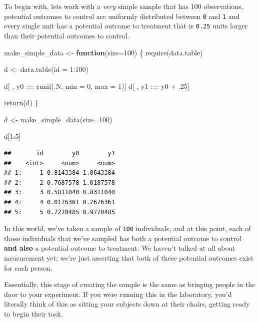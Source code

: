 \documentclass[
]{article}
\newenvironment{Shaded}{\begin{snugshade}}{\end{snugshade}}
\newcommand{\AttributeTok}[1]{\textcolor[rgb]{0.77,0.63,0.00}{#1}}
\newcommand{\ControlFlowTok}[1]{\textcolor[rgb]{0.13,0.29,0.53}{\textbf{#1}}}
\newcommand{\DecValTok}[1]{\textcolor[rgb]{0.00,0.00,0.81}{#1}}
\newcommand{\ErrorTok}[1]{\textcolor[rgb]{0.64,0.00,0.00}{\textbf{#1}}}
\newcommand{\FunctionTok}[1]{\textcolor[rgb]{0.00,0.00,0.00}{#1}}
\newcommand{\NormalTok}[1]{#1}
\newcommand{\OtherTok}[1]{\textcolor[rgb]{0.56,0.35,0.01}{#1}}
\newcommand{\SpecialCharTok}[1]{\textcolor[rgb]{0.00,0.00,0.00}{#1}}
\begin{document}
To begin with, lets work with a \emph{very} simple sample that has 100 observations, potential outcomes to control are uniformly distributed between \texttt{0} and \texttt{1} and every single unit has a potential outcome to treatment that is \texttt{0.25} units larger than their potential outcomes to control.

\begin{Shaded}
\begin{Highlighting}[]
\NormalTok{make\_simple\_data }\OtherTok{\textless{}{-}} \ControlFlowTok{function}\NormalTok{(}\AttributeTok{size=}\DecValTok{100}\NormalTok{) \{ }
  \FunctionTok{require}\NormalTok{(data.table) }
  
\NormalTok{  d }\OtherTok{\textless{}{-}} \FunctionTok{data.table}\NormalTok{(}\AttributeTok{id =} \DecValTok{1}\SpecialCharTok{:}\DecValTok{100}\NormalTok{)  }
  
\NormalTok{  d[ , y0 }\SpecialCharTok{:}\ErrorTok{=} \FunctionTok{runif}\NormalTok{(.N, }\AttributeTok{min =} \DecValTok{0}\NormalTok{, }\AttributeTok{max =} \DecValTok{1}\NormalTok{)]}
\NormalTok{  d[ , y1 }\SpecialCharTok{:}\ErrorTok{=}\NormalTok{ y0 }\SpecialCharTok{+}\NormalTok{ .}\DecValTok{25}\NormalTok{]}
  
  \FunctionTok{return}\NormalTok{(d)}
\NormalTok{  \}}

\NormalTok{d }\OtherTok{\textless{}{-}} \FunctionTok{make\_simple\_data}\NormalTok{(}\AttributeTok{size=}\DecValTok{100}\NormalTok{)}

\NormalTok{d[}\DecValTok{1}\SpecialCharTok{:}\DecValTok{5}\NormalTok{]}
\end{Highlighting}
\end{Shaded}

\begin{verbatim}
##       id        y0        y1
##    <int>     <num>     <num>
## 1:     1 0.8143384 1.0643384
## 2:     2 0.7687578 1.0187578
## 3:     3 0.5811040 0.8311040
## 4:     4 0.0176361 0.2676361
## 5:     5 0.7270485 0.9770485
\end{verbatim}

In this world, we've taken a sample of \texttt{100} individuals, and at this point, each of those individuals that we've sampled has both a potential outcome to control \textbf{and also} a potential outcome to treatment. We haven't talked at all about measurement yet; we're just asserting that both of these potential outcomes exist for each person.

Essentially, this stage of creating the sample is the same as bringing people in the door to your experiment. If you were running this in the laboratory, you'd literally think of this as sitting your subjects down at their chairs, getting ready to begin their task.
\end{document}
